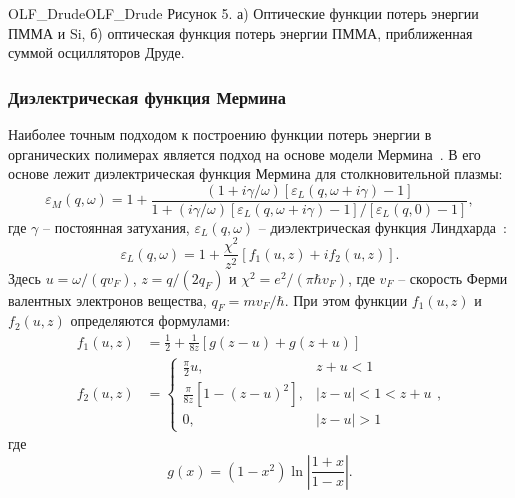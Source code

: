 \begin{fig}{OLF_Drude}{OLF_Drude}
	Рисунок 5. а) Оптические функции потерь энергии ПММА и Si, б) оптическая функция потерь энергии ПММА, приближенная суммой осцилляторов Друде.
\end{fig}


\subsubsection{Диэлектрическая функция Мермина}
Наиболее точным подходом к построению функции потерь энергии в органических полимерах является подход на основе модели Мермина~\cite{Mermin}. В его основе лежит диэлектрическая функция Мермина для столкновительной плазмы:
\begin{equation}
	\varepsilon_M(q, \omega)=1+\frac{(1+i \gamma / \omega)\left[\varepsilon_L(q, \omega+i \gamma)-1\right]}{1+(i \gamma / \omega)\left[\varepsilon_L(q, \omega+i \gamma)-1\right] /\left[\varepsilon_L(q, 0)-1\right]},
\end{equation}
где $\gamma$ -- постоянная затухания, $\varepsilon_L(q, \omega)$ -- диэлектрическая функция Линдхарда~\cite{Lindhard}:
\begin{equation}
	\varepsilon_L(q, \omega)=1+\frac{\chi^2}{z^2}\left[f_1(u, z)+i f_2(u, z)\right].
\end{equation}
Здесь $u=\omega /\left(q v_F\right)$, $z=q /\left(2 q_F\right)$ и $\chi^2=e^2 /\left(\pi \hbar v_F\right)$, где $v_F$
-- скорость Ферми валентных электронов вещества, $q_F=m v_F / \hbar$. При этом функции $f_1(u, z)$ и $f_2(u, z)$ определяются формулами:
\begin{equation}
	\begin{aligned}
		f_1(u, z) &=\frac{1}{2}+\frac{1}{8 z}[g(z-u)+g(z+u)] \\
		f_2(u, z) &= \begin{cases}\frac{\pi}{2} u, & z+u<1 \\
			\frac{\pi}{8 z}\left[1-(z-u)^2\right], & |z-u|<1<z+u \\
			0, & |z-u|>1\end{cases},
	\end{aligned}
\end{equation}
где
\begin{equation}
	g(x)=\left(1-x^2\right) \ln \left|\frac{1+x}{1-x}\right|.
\end{equation}

